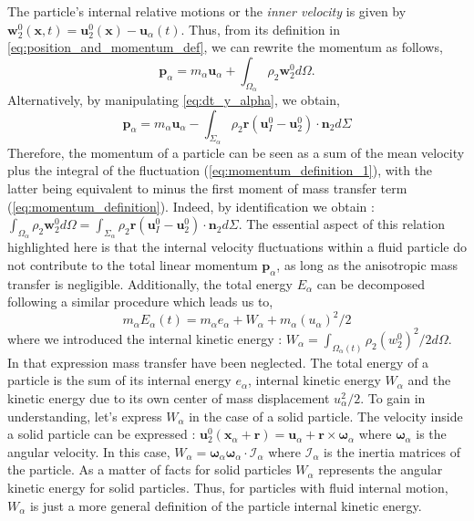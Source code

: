 The particle's internal relative motions or the \textit{inner velocity} is given by $\textbf{w}_2^0(\textbf{x},t) = \textbf{u}_2^0(\textbf{x}) - \textbf{u}_\alpha(t)$.
Thus, from its definition in \ref{eq:position_and_momentum_def}, we can rewrite the momentum as follows,
\begin{equation}
    \label{eq:momentum_definition_1}
    \textbf{p}_\alpha
    = m_\alpha \textbf{u}_\alpha
    + \int_{\Omega_\alpha} \rho_2 \textbf{w}_2^0 d\Omega.
\end{equation}
Alternatively, by manipulating \ref{eq:dt_y_alpha}, we obtain,
\begin{equation}
    \textbf{p}_\alpha
    =  m_\alpha \textbf{u}_\alpha
    - \int_{\Sigma_\alpha} \rho_2\textbf{r}(\textbf{u}_I^0 - \textbf{u}_2^0)\cdot \textbf{n}_2 d\Sigma
    \label{eq:momentum_definition}
\end{equation}
Therefore, the momentum of a particle can be seen as a sum of the mean velocity plus the integral of the fluctuation (\ref{eq:momentum_definition_1}), with the latter being equivalent to minus the first moment of mass transfer term (\ref{eq:momentum_definition}).
Indeed, by identification we obtain : $\int_{\Omega_\alpha} \rho_2 \textbf{w}_2^0 d\Omega =\int_{\Sigma_\alpha}  \rho_2\textbf{r} (\textbf{u}_I^0 - \textbf{u}_2^0)\cdot \textbf{n}_2 d\Sigma$. 
The essential aspect of this relation highlighted here is that the internal velocity fluctuations within a fluid particle do not contribute to the total linear momentum $\textbf{p}_\alpha$, as long as the anisotropic mass transfer is negligible.  
Additionally, the total energy $E_\alpha$ can be decomposed following a similar procedure which leads us to, 
\begin{equation*}
    \label{eq:E_alpha_def}
    m_\alpha E_\alpha(t) 
    = m_\alpha e_\alpha 
    + W_\alpha
    + m_\alpha (u_\alpha)^2/2
\end{equation*}
where we introduced the internal kinetic energy : $W_\alpha = \int_{\Omega_\alpha(t)} \rho_2  (w_2^0)^2/2 d\Omega$. 
In that expression mass transfer have been neglected. 
The total energy of a particle is the sum of its internal energy $e_\alpha$, internal kinetic energy $W_\alpha$ and the kinetic energy  due to its own center of mass displacement $u_\alpha^2/2$. 
To gain in understanding, let's express $W_\alpha$ in the case of a solid particle.
The velocity inside a solid particle can be expressed : $\textbf{u}_2^0(\textbf{x}_\alpha + \textbf{r}) = \textbf{u}_\alpha + \textbf{r}\times \bm{\omega}_\alpha$ where $\bm{\omega}_\alpha$ is the angular velocity.  
In this case, $W_\alpha = \bm{\omega}_\alpha\bm{\omega}_\alpha\cdot \mathcal{I}_\alpha$ where $\mathcal{I}_\alpha$ is the inertia matrices of the particle. 
As a matter of facts for solid particles $W_\alpha$ represents the angular kinetic energy for solid particles.
Thus, for particles with fluid internal motion, $W_\alpha$ is just a more general definition of the particle internal kinetic energy. 

